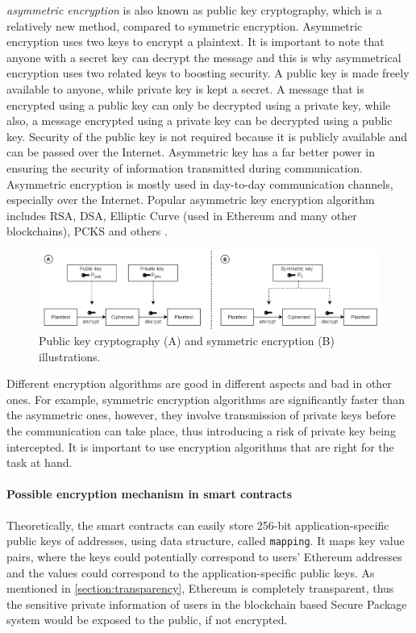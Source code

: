 \textit{\Gls{asymmetric encryption}} is also known as public key cryptography, which is a relatively new method, compared to symmetric encryption. Asymmetric encryption uses two keys to encrypt a plaintext. It is important to note that anyone with a secret key can decrypt the message and this is why asymmetrical encryption uses two related keys to boosting security. A public key is made freely available to anyone, while private key is kept a secret. A message that is encrypted using a public key can only be decrypted using a private key, while also, a message encrypted using a private key can be decrypted using a public key. Security of the public key is not required because it is publicly available and can be passed over the Internet. Asymmetric key has a far better power in ensuring the security of information transmitted during communication. Asymmetric encryption is mostly used in day-to-day communication channels, especially over the Internet. Popular asymmetric key encryption algorithm includes RSA, DSA, Elliptic Curve (used in Ethereum and many other blockchains), PCKS and others \citep{pubvssym}.

\begin{figure}[H]
\centering
\includegraphics[scale=0.55]{images/pubpriv.png}
\caption{Public key cryptography (A) and symmetric encryption (B) illustrations.}
\label{fig:keygenerationether}
\end{figure}

Different encryption algorithms are good in different aspects and bad in other ones. For example, symmetric encryption algorithms are significantly faster than the asymmetric ones, however, they involve transmission of private keys before the communication can take place, thus introducing a risk of private key being intercepted. It is important to use encryption algorithms that are right for the task at hand.

\paragraph{Possible encryption mechanism in smart contracts}
Theoretically, the smart contracts can easily store 256-bit application-specific public keys of addresses, using data structure, called \texttt{mapping}. It maps key value pairs, where the keys could potentially correspond to users' Ethereum addresses and the values could correspond to the application-specific public keys. As mentioned in \ref{section:transparency}, Ethereum is completely transparent, thus the sensitive private information of users in the blockchain based Secure Package system would be exposed to the public, if not encrypted. 

